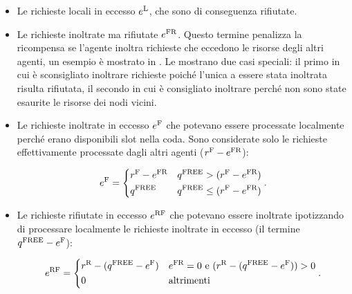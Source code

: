 \begin{itemize}
    \item Le richieste locali in eccesso $e^\textnormal{L}$, che sono di conseguenza rifiutate.

    \item Le richieste inoltrate ma rifiutate $e^\textnormal{FR}$. Questo termine penalizza la ricompensa se l'agente inoltra richieste che eccedono le risorse degli altri agenti, un esempio è mostrato in . Le  mostrano due casi speciali: il primo in cui è sconsigliato inoltrare richieste poiché l'unica a essere stata inoltrata risulta rifiutata, il secondo in cui è consigliato inoltrare perché non sono state esaurite le risorse dei nodi vicini.

    \item Le richieste inoltrate in eccesso $e^\textnormal{F}$ che potevano essere processate localmente perché erano disponibili slot nella coda. Sono considerate solo le richieste effettivamente processate dagli altri agenti ($r^\textnormal{F} - e^\textnormal{FR}$):

    \begin{equation}
        e^\textnormal{F} = \begin{dcases}
            r^\textnormal{F} - e^\textnormal{FR} & q^\textnormal{FREE} > (r^\textnormal{F} - e^\textnormal{FR}) \\
            q^\textnormal{FREE} & q^\textnormal{FREE} \le (r^\textnormal{F} - e^\textnormal{FR})
        \end{dcases}.
    \end{equation}

    \item Le richieste rifiutate in eccesso $e^\textnormal{RF}$ che potevano essere inoltrate ipotizzando di processare localmente le richieste inoltrate in eccesso (il termine $q^\textnormal{FREE} - e^\textnormal{F}$):

    \begin{equation}
        e^\textnormal{RF} = \begin{dcases}
            r^\textnormal{R} - (q^\textnormal{FREE} - e^\textnormal{F}) & e^\textnormal{FR} = 0 \textnormal{ e } (r^\textnormal{R} - (q^\textnormal{FREE} - e^\textnormal{F})) > 0  \\
            0 & \textnormal{altrimenti}
        \end{dcases}.
    \end{equation}


\end{itemize}

